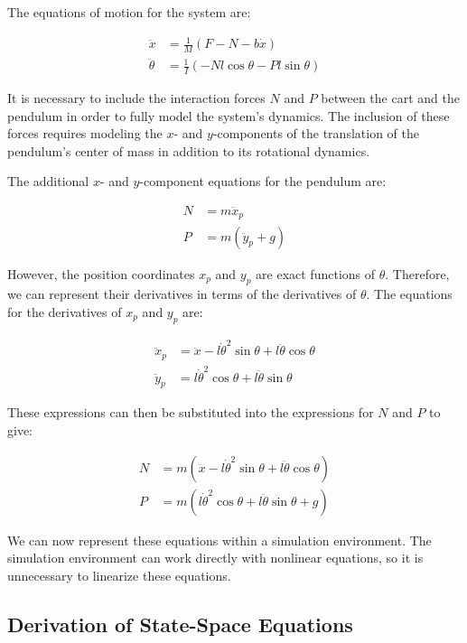 \documentclass[11pt,twocolumn,twoside,lineno]{pnas-new}
\begin{document}
The equations of motion for the system are:

\begin{align}
\ddot{x} &= \frac{1}{M}(F - N - b\dot{x}) \\
\ddot{\theta} &= \frac{1}{I}(-Nl\cos\theta - Pl\sin\theta)
\end{align}

It is necessary to include the interaction forces \(N\) and \(P\) between the cart and the pendulum in order to fully model the system's dynamics. The inclusion of these forces requires modeling the \(x\)- and \(y\)-components of the translation of the pendulum's center of mass in addition to its rotational dynamics.

The additional \(x\)- and \(y\)-component equations for the pendulum are:

\begin{align}
N &= m\ddot{x}_p \\
P &= m(\ddot{y}_p + g)
\end{align}

However, the position coordinates \(x_p\) and \(y_p\) are exact functions of \(\theta\). Therefore, we can represent their derivatives in terms of the derivatives of \(\theta\). The equations for the derivatives of \(x_p\) and \(y_p\) are:

\begin{align}
\ddot{x}_p &= \ddot{x} - l\dot{\theta}^2\sin\theta + l\ddot{\theta}\cos\theta \\
\ddot{y}_p &= l\dot{\theta}^2\cos\theta + l\ddot{\theta}\sin\theta
\end{align}

These expressions can then be substituted into the expressions for \(N\) and \(P\) to give:

\begin{align}
N &= m(\ddot{x} - l\dot{\theta}^2\sin\theta + l\ddot{\theta}\cos\theta) \\
P &= m(l\dot{\theta}^2\cos\theta + l\ddot{\theta}\sin\theta + g)
\end{align}

We can now represent these equations within a simulation environment. The simulation environment can work directly with nonlinear equations, so it is unnecessary to linearize these equations.

\subsection{Derivation of State-Space Equations}
\end{document}
